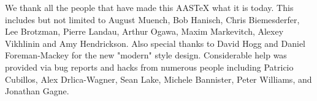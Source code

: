 \documentclass[linenumbers]{aastex631}
\begin{document}
\begin{acknowledgments}
We thank all the people that have made this AASTeX what it is today.  This
includes but not limited to August Muench, Bob Hanisch, Chris Biemesderfer, Lee Brotzman,
Pierre Landau, Arthur Ogawa, Maxim Markevitch, Alexey Vikhlinin and Amy
Hendrickson. Also special thanks to David Hogg and Daniel Foreman-Mackey
for the new "modern" style design. Considerable help was provided via bug
reports and hacks from numerous people including Patricio Cubillos, Alex
Drlica-Wagner, Sean Lake, Michele Bannister, Peter Williams, and Jonathan
Gagne.
\end{acknowledgments}

%

\vspace{5mm}


\end{document}
